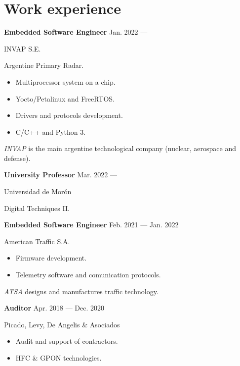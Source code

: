 \section{Work experience}


\parbox[t][][t]{\linewidth}{
	\parbox{\linewidth}{
		\textbf{Embedded Software Engineer}
			\hfill
			{Jan. 2022 --- \phantom{Dec. 2099}}
		}
	\smallbreak
	\parbox{\linewidth}{INVAP S.E.}
	\smallbreak
	Argentine Primary Radar.
	\begin{itemize}
	    \item{Multiprocessor system on a chip.}
		\item{Yocto/Petalinux and FreeRTOS.}
		\item{Drivers and protocols development.}
		\item{C/C++ and Python 3.}
	\end{itemize}
	\smallbreak
    \emph{INVAP} is the main argentine technological company (nuclear, aerospace and defense).
}

\bigskip
\parbox[t][][t]{\linewidth}{
	\parbox{\linewidth}{
		\textbf{University Professor}
			\hfill
			{Mar. 2022 --- \phantom{Dec. 2099}}
		}
	\smallbreak
	\parbox{\linewidth}{Universidad de Morón}
	\smallbreak
	Digital Techniques II.
}

\bigskip
\parbox[t][][t]{\linewidth}{
	\parbox{\linewidth}{
		\textbf{Embedded Software Engineer}
			\hfill
			{Feb. 2021 --- Jan. 2022}
		}
	\smallbreak
	\parbox{\linewidth}{American Traffic S.A.}
	\smallbreak
	\begin{itemize}
	    \item{Firmware development.}
	    \item{Telemetry software and comunication protocols.}
	\end{itemize}
	\smallbreak
    \emph{ATSA} designs and manufactures traffic technology.
}

\bigskip
\parbox[t][][t]{\linewidth}{
	\parbox{\linewidth}{
		\textbf{Auditor}
			\hfill
			{Apr. 2018 --- Dec. 2020}
		}
	\smallbreak
	\parbox{\linewidth}{Picado, Levy, De Angelis \& Asociados}
	\smallbreak
	\begin{itemize}
	    \item{Audit and support of contractors.}
	    \item{HFC \& GPON technologies.}
	\end{itemize}
	\smallbreak
}

